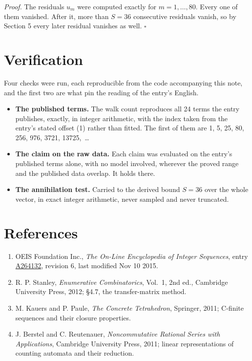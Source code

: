 \documentclass[11pt]{article}
\theoremstyle{definition}
\begin{document}
{\itshape Proof.} The residuals $u_m$ were computed exactly for $m = 1,\dots,80$. Every one of them vanished. After it, more than $S = 36$ consecutive residuals vanish, so by Section 5 every later residual vanishes as well. $\square$

\section{Verification}

Four checks were run, each reproducible from the code accompanying this note, and the first two are what pin the reading of the entry's English.

\begin{itemize}

\item {\bfseries The published terms.} The walk count reproduces all 24 terms the entry publishes, exactly, in integer arithmetic, with the index taken from the entry's stated offset (1) rather than fitted. The first of them are 1, 5, 25, 80, 256, 976, 3721, 13725,~\dots

\item {\bfseries The claim on the raw data.} Each claim was evaluated on the entry's published terms alone, with no model involved, wherever the proved range and the published data overlap. It holds there.

\item {\bfseries The annihilation test.} Carried to the derived bound $S = 36$ over the whole vector, in exact integer arithmetic, never sampled and never truncated.

\end{itemize}

\section{References}

\begin{enumerate}

\item OEIS Foundation Inc., \emph{The On-Line Encyclopedia of Integer Sequences}, entry \href{https://oeis.org/A264132}{A264132}, revision 6, last modified Nov 10 2015.

\item R. P. Stanley, \emph{Enumerative Combinatorics}, Vol.~1, 2nd ed., Cambridge University Press, 2012; \S4.7, the transfer-matrix method.

\item M. Kauers and P. Paule, \emph{The Concrete Tetrahedron}, Springer, 2011; C-finite sequences and their closure properties.

\item J. Berstel and C. Reutenauer, \emph{Noncommutative Rational Series with Applications}, Cambridge University Press, 2011; linear representations of counting automata and their reduction.

\end{enumerate}
\end{document}

